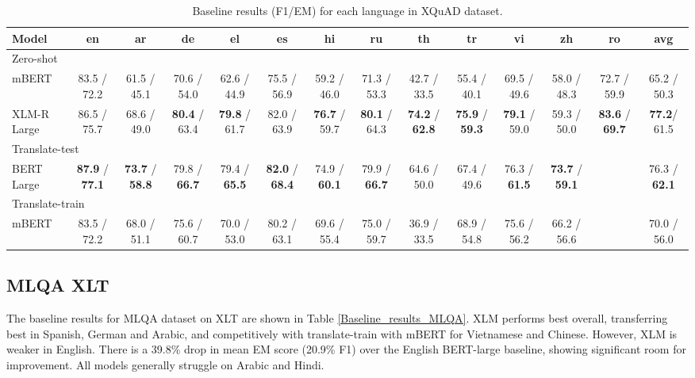 \documentclass[11pt]{article}
\begin{document}
\begin{table*}[!ht]
    \centering
    \begin{adjustbox}{max width=\textwidth}
    \begin{tabular}{l|cccccccccccc|c}
    \toprule
        Model & en & ar & de & el & es & hi & ru & th & tr & vi & zh & ro & avg \\ \midrule
        \multicolumn{14}{l}{Zero-shot} \\ \midrule
        mBERT & 83.5 / 72.2 & 61.5 / 45.1 & 70.6 / 54.0 & 62.6 / 44.9 & 75.5 / 56.9 & 59.2 / 46.0 & 71.3 / 53.3 & 42.7 / 33.5 & 55.4 / 40.1 & 69.5 / 49.6 & 58.0 / 48.3 & 72.7 / 59.9 & 65.2 / 50.3 \\ 
        XLM-R Large & 86.5 / 75.7 & 68.6 / 49.0 & \textbf{80.4} / 63.4 & \textbf{79.8} / 61.7 & 82.0 / 63.9 & \textbf{76.7} / 59.7 & \textbf{80.1} / 64.3 & \textbf{74.2} / \textbf{62.8} & \textbf{75.9} / \textbf{59.3} & \textbf{79.1} / 59.0 & 59.3 / 50.0 & \textbf{83.6} / \textbf{69.7} & \textbf{77.2}/ 61.5 \\ \midrule
        \multicolumn{14}{l}{Translate-test} \\ \midrule
        BERT Large & \textbf{87.9} / \textbf{77.1} & \textbf{73.7} / \textbf{58.8} & 79.8 / \textbf{66.7} & 79.4 / \textbf{65.5} & \textbf{82.0} / \textbf{68.4} & 74.9 / \textbf{60.1} & 79.9 / \textbf{66.7} & 64.6 / 50.0 & 67.4 / 49.6 & 76.3 / \textbf{61.5} & \textbf{73.7} / \textbf{59.1} & ~ & 76.3 / \textbf{62.1} \\ \midrule
        \multicolumn{14}{l}{Translate-train} \\ \midrule
        mBERT & 83.5 / 72.2 & 68.0 / 51.1 & 75.6 / 60.7 & 70.0 / 53.0 & 80.2 / 63.1 & 69.6 / 55.4 & 75.0 / 59.7 & 36.9 / 33.5 & 68.9 / 54.8 & 75.6 / 56.2 & 66.2 / 56.6 & ~ & 70.0 / 56.0 \\ 
        \bottomrule
    \end{tabular}
    \end{adjustbox}
    \caption{Baseline results (F1/EM) for each language in XQuAD dataset.}
    \label{Baseline_results_XQuAD}
\end{table*}

\subsection{MLQA XLT}

The baseline results for MLQA dataset on XLT are shown in Table \ref{Baseline_results_MLQA}. XLM performs best overall, transferring best in Spanish, German and Arabic, and competitively with translate-train with mBERT for Vietnamese and Chinese. However, XLM is weaker in English. There is a 39.8\% drop in mean EM score (20.9\% F1) over the English BERT-large baseline,
showing significant room for improvement. All models generally struggle on Arabic and Hindi.
\end{document}
